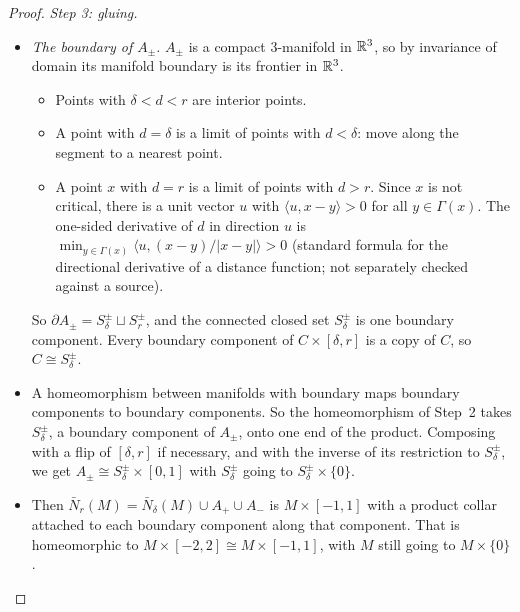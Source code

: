 \begin{proof}
\emph{Step 3: gluing.}
\begin{itemize}
\item \emph{The boundary of $A_\pm$.} $A_\pm$ is a compact 3-manifold in $\mathbb{R}^3$, so by invariance of domain its manifold
boundary is its frontier in $\mathbb{R}^3$.
  \begin{itemize}
  \item Points with $\delta<d<r$ are interior points.
  \item A point with $d=\delta$ is a limit of points with $d<\delta$: move along the segment to a nearest point.
  \item A point $x$ with $d=r$ is a limit of points with $d>r$. Since $x$ is not critical, there is a unit vector $u$
  with $\langle u,x-y\rangle>0$ for all $y\in\Gamma(x)$. The one-sided derivative of $d$ in direction $u$ is
  $\min_{y\in\Gamma(x)}\langle u,(x-y)/|x-y|\rangle>0$ (standard formula for the directional derivative of a distance
  function; not separately checked against a source).
  \end{itemize}
  So $\partial A_\pm=S^\pm_\delta\sqcup S^\pm_r$, and the connected closed set $S^\pm_\delta$ is one boundary component.
  Every boundary component of $C\times[\delta,r]$ is a copy of $C$, so $C\cong S^\pm_\delta$.
\item A homeomorphism between manifolds with boundary maps boundary components to boundary components. So the
homeomorphism of Step~2 takes $S^\pm_\delta$, a boundary component of $A_\pm$, onto one end of the product. Composing
with a flip of $[\delta,r]$ if necessary, and with the inverse of its restriction to $S^\pm_\delta$, we get
$A_\pm\cong S^\pm_\delta\times[0,1]$ with $S^\pm_\delta$ going to $S^\pm_\delta\times\{0\}$.
\item Then $\bar N_r(M)=\bar N_\delta(M)\cup A_+\cup A_-$ is $M\times[-1,1]$ with a product collar attached to each
boundary component along that component. That is homeomorphic to $M\times[-2,2]\cong M\times[-1,1]$, with $M$ still
going to $M\times\{0\}$.
\end{itemize}


\end{proof}
